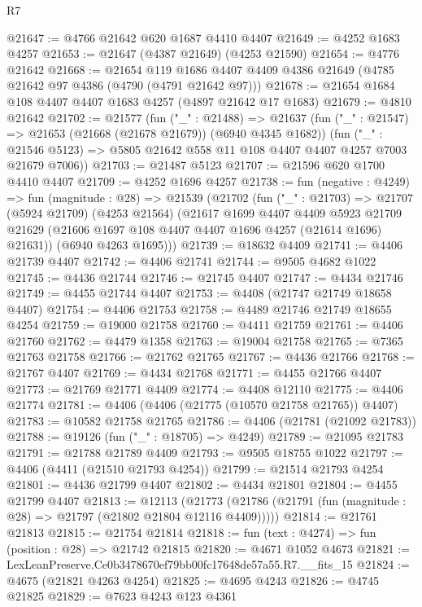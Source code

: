 \begin{lexlean}{R7}
\begin{coremodule}
@21647 := @4766 @21642 @620 @1687 @4410 @4407
@21649 := @4252 @1683 @4257
@21653 := @21647 (@4387 @21649) (@4253 @21590)
@21654 := @4776 @21642
@21668 := @21654
    @119
    @1686
    @4407
    @4409
    @4386
    @21649
    (@4785 @21642 @97 @4386 (@4790 (@4791 @21642 @97)))
@21678 := @21654 @1684 @108 @4407 @4407 @1683 @4257 (@4897 @21642 @17 @1683)
@21679 := @4810 @21642
@21702 := @21577
    (fun ("_" : @21488) =>
    @21637
      (fun ("_" : @21547) => @21653 (@21668 (@21678 @21679)) (@6940 @4345 @1682))
      (fun ("_" : @21546 @5123) => @5805 @21642 @558 @11 @108 @4407 @4407 @4257 @7003 @21679 @7006))
@21703 := @21487 @5123
@21707 := @21596 @620 @1700 @4410 @4407
@21709 := @4252 @1696 @4257
@21738 := fun (negative : @4249) =>
  fun (magnitude : @28) =>
  @21539
    (@21702
      (fun ("_" : @21703) =>
      @21707
        (@5924 @21709)
        (@4253 @21564)
        (@21617
          @1699
          @4407
          @4409
          @5923
          @21709
          @21629
          (@21606 @1697 @108 @4407 @4407 @1696 @4257 (@21614 @1696) @21631))
        (@6940 @4263 @1695)))
@21739 := @18632 @4409
@21741 := @4406 @21739 @4407
@21742 := @4406 @21741
@21744 := @9505 @4682 @1022
@21745 := @4436 @21744
@21746 := @21745 @4407
@21747 := @4434 @21746
@21749 := @4455 @21744 @4407
@21753 := @4408 (@21747 @21749 @18658 @4407)
@21754 := @4406 @21753
@21758 := @4489 @21746 @21749 @18655 @4254
@21759 := @19000 @21758
@21760 := @4411 @21759
@21761 := @4406 @21760
@21762 := @4479 @1358
@21763 := @19004 @21758
@21765 := @7365 @21763 @21758
@21766 := @21762 @21765
@21767 := @4436 @21766
@21768 := @21767 @4407
@21769 := @4434 @21768
@21771 := @4455 @21766 @4407
@21773 := @21769 @21771 @4409
@21774 := @4408 @12110
@21775 := @4406 @21774
@21781 := @4406 (@4406 (@21775 (@10570 @21758 @21765)) @4407)
@21783 := @10582 @21758 @21765
@21786 := @4406 (@21781 (@21092 @21783))
@21788 := @19126 (fun ("_" : @18705) => @4249)
@21789 := @21095 @21783
@21791 := @21788 @21789 @4409
@21793 := @9505 @18755 @1022
@21797 := @4406 (@4411 (@21510 @21793 @4254))
@21799 := @21514 @21793 @4254
@21801 := @4436 @21799 @4407
@21802 := @4434 @21801
@21804 := @4455 @21799 @4407
@21813 := @12113
    (@21773 (@21786 (@21791 (fun (magnitude : @28) => @21797 (@21802 @21804 @12116 @4409)))))
@21814 := @21761 @21813
@21815 := @21754 @21814
@21818 := fun (text : @4274) => fun (position : @28) => @21742 @21815
@21820 := @4671 @1052 @4673
@21821 := LexLeanPreserve.Ce0b3478670ef79bb00fc17648de57a55.R7.__fits_15
@21824 := @4675 (@21821 @4263 @4254)
@21825 := @4695 @4243
@21826 := @4745 @21825
@21829 := @7623 @4243 @123 @4361

\end{coremodule}
\end{lexlean}
